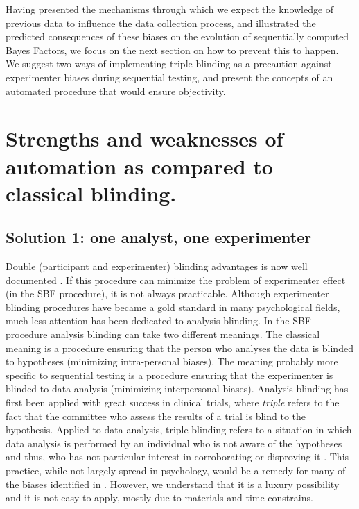 \documentclass[a4paper,man,natbib,floatsintext,donotrepeattitle]{apa6}
\begin{document}
Having presented the mechanisms through which we expect the knowledge of previous data to influence the data collection process, and illustrated the predicted consequences of these biases on the evolution of sequentially computed Bayes Factors, we focus on the next section on how to prevent this to happen. We suggest two ways of implementing triple blinding as a precaution against experimenter biases during sequential testing, and present the concepts of an automated procedure that would ensure objectivity.

\section{Strengths and weaknesses of automation as compared to classical blinding.}

\subsection{Solution 1: one analyst, one experimenter}


Double (participant and experimenter) blinding advantages is now well documented \citep{schulz_blinding_2002}. If this procedure can minimize the problem of experimenter effect (in the SBF procedure), it is not always practicable. Although experimenter blinding procedures have became a gold standard in many psychological fields, much less attention has been dedicated to analysis blinding. In the SBF procedure analysis blinding can take two different meanings. The classical meaning is a procedure ensuring that the person who analyses the data is blinded to hypotheses (minimizing intra-personal biases). The meaning probably more specific to sequential testing is a procedure ensuring that the experimenter is blinded to data analysis (minimizing interpersonal biases). Analysis blinding has first been applied with great success in clinical trials, where \textit{triple} refers to the fact that the committee who assess the results of a trial is blind to the hypothesis. Applied to data analysis, triple blinding refers to a situation in which data analysis is performed by an individual who is not aware of the hypotheses and thus, who has not particular interest in corroborating or disproving it \citep{miller_blind_2011}. This practice, while not largely spread in psychology, would be a remedy for many of the biases identified in \cite{wicherts_degrees_2016}. However, we understand that it is a luxury possibility and it is not easy to apply, mostly due to materials and time constrains.
\end{document}
